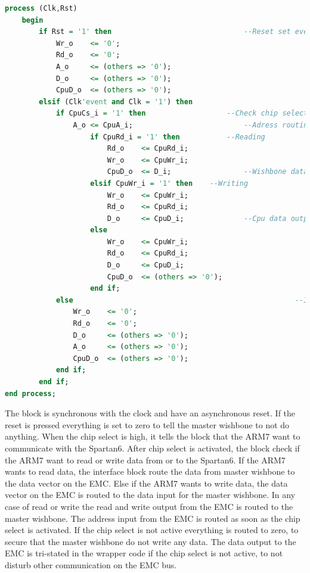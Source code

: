 \begin{lstlisting}[language=VHDL]
process (Clk,Rst)
	begin  
		if Rst = '1' then								--Reset set everything to 0
			Wr_o	<= '0';
			Rd_o	<= '0';
			A_o		<= (others => '0');
			D_o		<= (others => '0');
			CpuD_o	<= (others => '0');
		elsif (Clk'event and Clk = '1') then
			if CpuCs_i = '1' then					--Check chip select
				A_o	<= CpuA_i;							--Adress routing
					if CpuRd_i = '1' then			--Reading
						Rd_o	<= CpuRd_i;
						Wr_o	<= CpuWr_i;
						CpuD_o	<= D_i;					--Wishbone data out to Cpu data input
					elsif CpuWr_i = '1' then	--Writing
						Wr_o	<= CpuWr_i;					
						Rd_o	<= CpuRd_i;
						D_o		<= CpuD_i;				--Cpu data output to wishbone data input
					else
						Wr_o	<= CpuWr_i;		
						Rd_o	<= CpuRd_i;
						D_o		<= CpuD_i;
						CpuD_o	<= (others => '0');
					end if;
			else													--If chip select not high everything is set to 0
				Wr_o	<= '0';	
				Rd_o	<= '0';
				D_o		<= (others => '0');
				A_o		<= (others => '0');
				CpuD_o	<= (others => '0');
			end if;
		end if;
end process;
\end{lstlisting}
The block is synchronous with the clock and have an asynchronous reset. If the reset is pressed everything is set to zero to tell the master wishbone to not do anything. When the chip select is high, it tells the block that the ARM7 want to communicate with the Spartan6. After chip select is activated, the block check if the ARM7 want to read or write data from or to the Spartan6. If the ARM7 wants to read data, the interface block route the data from master wishbone to the data vector on the EMC. Else if the ARM7 wants to write data, the data vector on the EMC is routed to the data input for the master wishbone. In any case of read or write the read and write output from the EMC is routed to the master wishbone. The address input from the EMC is routed as soon as the chip select is activated. If the chip select is not active everything is routed to zero, to secure that the master wishbone do not write any data. The data output to the EMC is tri-stated in the wrapper code if the chip select is not active, to not disturb other communication on the EMC bus.
